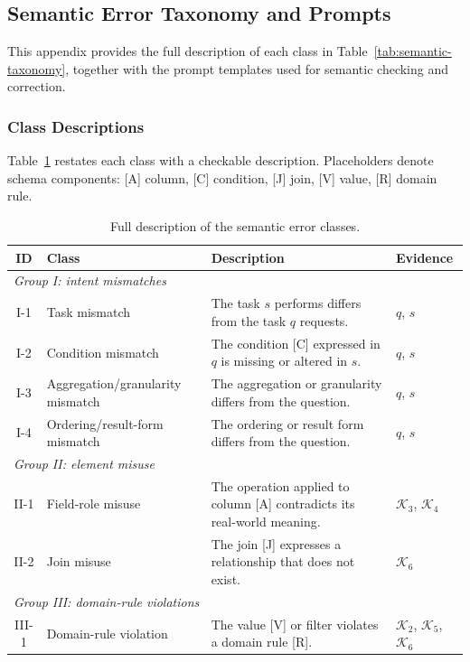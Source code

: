\documentclass[letterpaper,journal]{IEEEtran}
\begin{document}
\subsection{Semantic Error Taxonomy and Prompts}
\label{app:taxonomy}

This appendix provides the full description of each class in Table~\ref{tab:semantic-taxonomy}, together with the prompt templates used for semantic checking and correction.

\subsubsection{Class Descriptions}

Table~\ref{tab:taxonomy-details} restates each class with a checkable description. Placeholders denote schema components: [A] column, [C] condition, [J] join, [V] value, [R] domain rule.

\begin{table}[!t]
\centering
\caption{Full description of the semantic error classes.}
\label{tab:taxonomy-details}
\small
\setlength{\tabcolsep}{6pt}
\renewcommand{\arraystretch}{1.15}
\begin{tabular}{clll}
\toprule
\textbf{ID} & \textbf{Class} & \textbf{Description} & \textbf{Evidence} \\
\midrule
\multicolumn{4}{l}{\emph{Group I: intent mismatches}} \\
I-1 & Task mismatch & The task $s$ performs differs from the task $q$ requests. & $q$, $s$ \\
I-2 & Condition mismatch & The condition [C] expressed in $q$ is missing or altered in $s$. & $q$, $s$ \\
I-3 & Aggregation/granularity mismatch & The aggregation or granularity differs from the question. & $q$, $s$ \\
I-4 & Ordering/result-form mismatch & The ordering or result form differs from the question. & $q$, $s$ \\
\midrule
\multicolumn{4}{l}{\emph{Group II: element misuse}} \\
II-1 & Field-role misuse & The operation applied to column [A] contradicts its real-world meaning. & $\mathcal{K}_3$, $\mathcal{K}_4$ \\
II-2 & Join misuse & The join [J] expresses a relationship that does not exist. & $\mathcal{K}_6$ \\
\midrule
\multicolumn{4}{l}{\emph{Group III: domain-rule violations}} \\
III-1 & Domain-rule violation & The value [V] or filter violates a domain rule [R]. & $\mathcal{K}_2$, $\mathcal{K}_5$, $\mathcal{K}_6$ \\
\bottomrule
\end{tabular}
\end{table}
\end{document}
